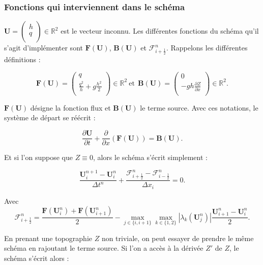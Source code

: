 \documentclass[
11pt, %
francais, %
singlespacing, %
headsepline, %
f%
]{MastersDoctoralThesis} %
\theoremstyle{definition}
\begin{document}
    \hypertarget{fonctions-qui-interviennent-dans-le-schuxe9ma}{%
\subsubsection*{Fonctions qui interviennent dans le
schéma}\label{fonctions-qui-interviennent-dans-le-schuxe9ma}}

\(\textbf{U}= \begin{pmatrix}  h \\  q \\ \end{pmatrix} \in\mathbb{R}^{2}\)
est le vecteur inconnu. Les différentes fonctions du schéma qu'il s'agit
d'implémenter sont \(\textbf{F}(\textbf{U})\),
\(\textbf{B}(\textbf{U})\) et \(\mathcal{F}_{i+\frac{1}{2}}^n\).
Rappelons les différentes définitions :

\[
\textbf{F} (\textbf{U}) =
\begin{pmatrix}
   q                                \\
   \frac{q^{2}}{h}+g\frac{h^{2}}{2} \\
\end{pmatrix}\in\mathbb{R}^{2} ~
\text{et} ~~ \textbf{B} (\textbf{U}) =
\begin{pmatrix}
   0                                \\
   -gh \frac{\partial Z}{\partial x}\\
\end{pmatrix}
\in\mathbb{R}^{2}.
\]

\(\textbf{F} (\textbf{U})\) désigne la fonction flux et
\(\textbf{B} (\textbf{U})\) le terme source. Avec ces notations, le
système de départ se réécrit :

\[\frac{\partial\textbf{U}}{\partial t}+\frac{\partial}{\partial x}(\textbf{F} (\textbf{U})) = \textbf{B} (\textbf{U}).\]

Et si l'on suppose que \(Z\equiv 0\), alors le schéma s'écrit simplement
:

\[\frac{\textbf{U}_i^{n+1}-\textbf{U}_i^{n}}{\Delta t^n}+\frac{\mathcal{F}_{i+\frac{1}{2}}^n - \mathcal{F}_{i-\frac{1}{2}}^n}{\Delta x_i}=0.\]

Avec
\[\mathcal{F}_{i+\frac{1}{2}}^n=\frac{\textbf{F}(\textbf{U}_i^{n})+\textbf{F}(\textbf{U}_{i+1}^{n})}{2}-\max_{j\in\{i,i+1\}}\max_{k\in\{1,2\}}|\lambda_k(\textbf{U}_j^n)|\frac{\textbf{U}_{i+1}^n-\textbf{U}_i^n}{2}.\]

En prenant une topographie \(Z\) non triviale, on peut essayer de
prendre le même schéma en rajoutant le terme source. Si l'on a accès à
la dérivée \(Z'\) de \(Z\), le schéma s'écrit alors :
\end{document}
